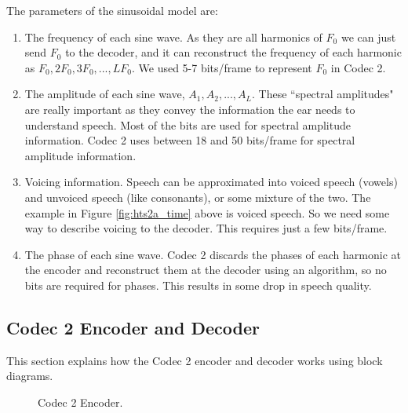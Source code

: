 \documentclass{article}
\begin{document}
The parameters of the sinusoidal model are:
\begin{enumerate}
\item The frequency of each sine wave.  As they are all harmonics of $F_0$ we can just send $F_0$ to the decoder, and it can reconstruct the frequency of each harmonic as $F_0,2F_0,3F_0,...,LF_0$.  We used 5-7 bits/frame to represent $F_0$ in Codec 2.
\item The amplitude of each sine wave, $A_1,A_2,...,A_L$.  These ``spectral amplitudes" are really important as they convey the information the ear needs to understand speech.  Most of the bits are used for spectral amplitude information.  Codec 2 uses between 18 and 50 bits/frame for spectral amplitude information.
\item Voicing information.  Speech can be approximated into voiced speech (vowels) and unvoiced speech (like consonants), or some mixture of the two.  The example in Figure \ref{fig:hts2a_time} above is voiced speech.  So we need some way to describe voicing to the decoder. This requires just a few bits/frame.
\item The phase of each sine wave.  Codec 2 discards the phases of each harmonic at the encoder and reconstruct them at the decoder using an algorithm, so no bits are required for phases.  This results in some drop in speech quality.
\end{enumerate}

\subsection{Codec 2 Encoder and Decoder}

This section explains how the Codec 2 encoder and decoder works using block diagrams.

\begin{figure}[h]
\caption{Codec 2 Encoder.}
\label{fig:codec2_encoder}
\begin{center}
\end{center}
\end{figure}
\end{document}
